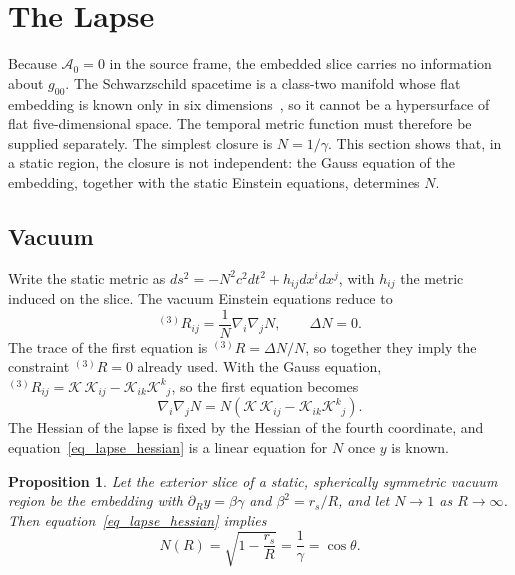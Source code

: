 \documentclass[pdflatex,sn-mathphys-num]{sn-jnl}%
\theoremstyle{thmstyleone}%
\newtheorem{proposition}[theorem]{Proposition}%
\theoremstyle{thmstyletwo}%
\theoremstyle{thmstylethree}%
\begin{document}
\section{The Lapse}\label{sec_lapse}

Because $\mathcal{A}_0=0$ in the source frame, the embedded slice carries no information about $g_{00}$. The Schwarzschild spacetime is a class-two manifold whose flat embedding is known only in six dimensions~\cite{Kasner1921}, so it cannot be a hypersurface of flat five-dimensional space. The temporal metric function must therefore be supplied separately. The simplest closure is $N=1/\gamma$. This section shows that, in a static region, the closure is not independent: the Gauss equation of the embedding, together with the static Einstein equations, determines $N$.

\subsection{Vacuum}\label{sec_lapse_vacuum}

Write the static metric as $ds^2=-N^2c^2dt^2+h_{ij}dx^idx^j$, with $h_{ij}$ the metric induced on the slice. The vacuum Einstein equations reduce to
\begin{equation}\label{eq_static_vacuum}
    {}^{(3)}\!R_{ij}=\frac1N\nabla_i\nabla_jN,\qquad \Delta N=0 .
\end{equation}
The trace of the first equation is ${}^{(3)}\!R=\Delta N/N$, so together they imply the constraint ${}^{(3)}\!R=0$ already used. With the Gauss equation, ${}^{(3)}\!R_{ij}=\mathcal{K}\,\mathcal{K}_{ij}-\mathcal{K}_{ik}\mathcal{K}^k{}_j$, so the first equation becomes
\begin{equation}\label{eq_lapse_hessian}
    \nabla_i\nabla_jN=N\left(\mathcal{K}\,\mathcal{K}_{ij}-\mathcal{K}_{ik}\mathcal{K}^k{}_j\right).
\end{equation}
The Hessian of the lapse is fixed by the Hessian of the fourth coordinate, and equation~\eqref{eq_lapse_hessian} is a linear equation for $N$ once $y$ is known.

\begin{proposition}\label{prop_lapse}
Let the exterior slice of a static, spherically symmetric vacuum region be the embedding with $\partial_Ry=\beta\gamma$ and $\beta^2=r_s/R$, and let $N\to1$ as $R\to\infty$. Then equation~\eqref{eq_lapse_hessian} implies
\begin{equation}\label{eq_lapse_vacuum}
    N(R)=\sqrt{1-\frac{r_s}{R}}=\frac1\gamma=\cos\theta .
\end{equation}
\end{proposition}
\end{document}
